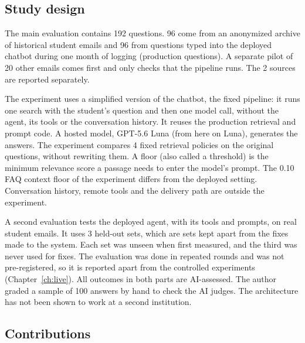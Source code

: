 \subsection{Study design}

The main evaluation contains 192 questions. 96 come from an anonymized archive of historical student emails and 96 from questions typed into the deployed chatbot during one month of logging (production questions). A separate pilot of 20 other emails comes first and only checks that the pipeline runs. The 2 sources are reported separately.

The experiment uses a simplified version of the chatbot, the fixed pipeline: it runs one search with the student's question and then one model call, without the agent, its tools or the conversation history. It reuses the production retrieval and prompt code. A hosted model, GPT-5.6 Luna (from here on Luna), generates the answers. The experiment compares 4 fixed retrieval policies on the original questions, without rewriting them. A floor (also called a threshold) is the minimum relevance score a passage needs to enter the model's prompt. The 0.10 FAQ context floor of the experiment differs from the deployed setting. Conversation history, remote tools and the delivery path are outside the experiment.

A second evaluation tests the deployed agent, with its tools and prompts, on real student emails. It uses 3 held-out sets, which are sets kept apart from the fixes made to the system. Each set was unseen when first measured, and the third was never used for fixes. The evaluation was done in repeated rounds and was not pre-registered, so it is reported apart from the controlled experiments (Chapter~\ref{ch:live}). All outcomes in both parts are AI-assessed. The author graded a sample of 100 answers by hand to check the AI judges. The architecture has not been shown to work at a second institution.

\subsection{Contributions}

